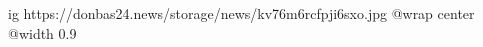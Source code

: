  
 
 
 
 

\ifcmt
  ig https://donbas24.news/storage/news/kv76m6rcfpji6sxo.jpg
  @wrap center
  @width 0.9
\fi
